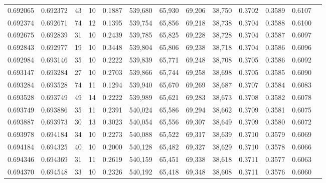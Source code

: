 \begin{tabular}{rrrrrrrrrrrrr}
0.692065 & 0.692372 &    43 &  10 &                                     0.1887 & 539,680 &  65,930 &  69,206 &  38,750 & 0.3702 & 0.3589 & 0.6107 \\
0.692374 & 0.692671 &    74 &  12 &                                     0.1395 & 539,754 &  65,856 &  69,218 &  38,738 & 0.3704 & 0.3588 & 0.6100 \\
0.692675 & 0.692839 &    31 &  10 &                                     0.2439 & 539,785 &  65,825 &  69,228 &  38,728 & 0.3704 & 0.3587 & 0.6097 \\
0.692843 & 0.692977 &    19 &  10 &                                     0.3448 & 539,804 &  65,806 &  69,238 &  38,718 & 0.3704 & 0.3586 & 0.6096 \\
0.692984 & 0.693146 &    35 &  10 &                                     0.2222 & 539,839 &  65,771 &  69,248 &  38,708 & 0.3705 & 0.3586 & 0.6092 \\
0.693147 & 0.693284 &    27 &  10 &                                     0.2703 & 539,866 &  65,744 &  69,258 &  38,698 & 0.3705 & 0.3585 & 0.6090 \\
0.693284 & 0.693528 &    74 &  11 &                                     0.1294 & 539,940 &  65,670 &  69,269 &  38,687 & 0.3707 & 0.3584 & 0.6083 \\
0.693528 & 0.693749 &    49 &  14 &                                     0.2222 & 539,989 &  65,621 &  69,283 &  38,673 & 0.3708 & 0.3582 & 0.6078 \\
0.693749 & 0.693886 &    35 &  11 &                                     0.2391 & 540,024 &  65,586 &  69,294 &  38,662 & 0.3709 & 0.3581 & 0.6075 \\
0.693887 & 0.693973 &    30 &  13 &                                     0.3023 & 540,054 &  65,556 &  69,307 &  38,649 & 0.3709 & 0.3580 & 0.6072 \\
0.693978 & 0.694184 &    34 &  10 &                                     0.2273 & 540,088 &  65,522 &  69,317 &  38,639 & 0.3710 & 0.3579 & 0.6069 \\
0.694184 & 0.694325 &    40 &  10 &                                     0.2000 & 540,128 &  65,482 &  69,327 &  38,629 & 0.3710 & 0.3578 & 0.6066 \\
0.694346 & 0.694369 &    31 &  11 &                                     0.2619 & 540,159 &  65,451 &  69,338 &  38,618 & 0.3711 & 0.3577 & 0.6063 \\
0.694370 & 0.694548 &    33 &  10 &                                     0.2326 & 540,192 &  65,418 &  69,348 &  38,608 & 0.3711 & 0.3576 & 0.6060 \\

\end{tabular}
